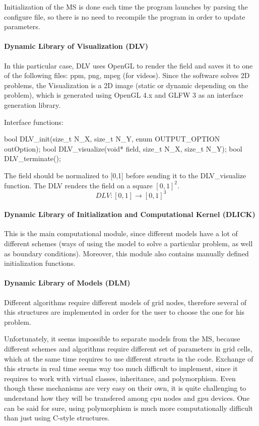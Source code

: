 Initialization of the MS is done each time the program launches by parsing the configure file, so there is no need to recompile the program in order to update parameters.

\paragraph*{Dynamic Library of Visualization (D\+LV)}

In this particular case, D\+LV uses Open\+GL to render the field and saves it to one of the following files\+: ppm, png, mpeg (for videos). Since the software solves 2D problems, the Visualization is a 2D image (static or dynamic depending on the problem), which is generated using Open\+GL 4.\+x and G\+L\+FW 3 as an interface generation library.

Interface functions\+:


\begin{DoxyCode}
bool DLV\_init(size\_t N\_X, size\_t N\_Y, enum OUTPUT\_OPTION outOption);
bool DLV\_visualize(void* field, size\_t N\_X, size\_t N\_Y);
bool DLV\_terminate();
\end{DoxyCode}


The field should be normalized to \mbox{[}0,1\mbox{]} before sending it to the {\ttfamily D\+L\+V\+\_\+visualize} function. The D\+LV renders the field on a square $[0,1]^2$. \[ DLV: [0,1] \rightarrow [0,1]^3 \]

\paragraph*{Dynamic Library of Initialization and Computational Kernel (D\+L\+I\+CK)}

This is the main computational module, since different models have a lot of different schemes (ways of using the model to solve a particular problem, as well as boundary conditions). Moreover, this module also contains manually defined initialization functions.

\paragraph*{Dynamic Library of Models (D\+LM)}

Different algorithms require different models of grid nodes, therefore several of this structures are implemented in order for the user to choose the one for his problem.

Unfortunately, it seems impossible to separate models from the MS, because different schemes and algorithms require different set of parameters in grid cells, which at the same time requires to use different structs in the code. Exchange of this structs in real time seems way too much difficult to implement, since it requires to work with virtual classes, inheritance, and polymorphism. Even though these mechanisms are very easy on their own, it is quite challenging to understand how they will be transfered among cpu nodes and gpu devices. One can be said for sure, using polymorphism is much more computationally difficult than just using C-\/style structures.

